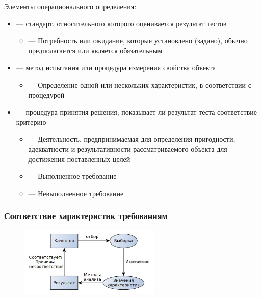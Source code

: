 \documentclass[a4paper, 14pt]{extarticle}
\begin{document}
Элементы операционального определения:
\begin{itemize}
    \item {} --- стандарт, относительного которого оценивается результат тестов
    \begin{itemize}
        \item {} --- Потребность или ожидание, которые установлено (задано), обычно предполагается или является обязательным
    \end{itemize}
    \item {} --- метод испытания или процедура измерения свойства объекта
    \begin{itemize}
        \item {} --- Определение одной или нескольких характеристик, в соответствии с процедурой
    \end{itemize}
    \item {} --- процедура принятия решения, показывает ли результат теста соответствие критерию
    \begin{itemize}
        \item {} --- Деятельность, предпринимаемая для определения пригодности, адекватности и результативности рассматриваемого объекта для достижения поставленных целей
        \item {} --- Выполненное требование
        \item {} --- Невыполненное требование
    \end{itemize}
\end{itemize}

\subsubsection*{Соответствие характеристик требованиям}
\begin{figure}[h]
    \centering
    \includegraphics[width=0.6\textwidth]{./img/L3/S001.jpg}
\end{figure}
\end{document}
